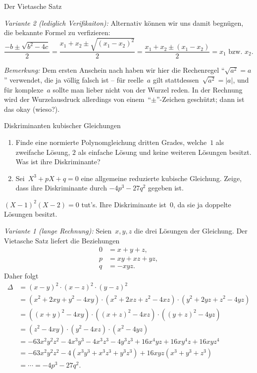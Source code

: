 \documentclass{algblatt}
\begin{document}
\begin{aufgabe}{Der Vietasche Satz}
\begin{loesungE}
\emph{Variante 2 (lediglich Verifikaiton):} Alternativ können wir uns damit
begnügen, die bekannte Formel zu verfizieren:
\[ \frac{-b \pm \sqrt{b^2 - 4c}}{2} =
  \frac{x_1 + x_2 \pm \sqrt{(x_1 - x_2)^2}}{2} =
  \frac{x_1 + x_2 \pm (x_1 - x_2)}{2} =
  \text{$x_1$ bzw. $x_2$}. \]

\emph{Bemerkung:} Dem ersten Anschein nach haben wir hier die Rechenregel
"`$\sqrt{a^2} = a$"' verwendet, die ja völlig falsch ist -- für reelle~$a$ gilt
stattdessen~$\sqrt{a^2} = |a|$, und für komplexe~$a$ sollte man lieber nicht
von der Wurzel reden. In der Rechnung wird der Wurzelausdruck allerdings von
einem~"`$\pm$"'-Zeichen geschützt; dann ist das okay (wieso?).
\end{loesungE}
\end{aufgabe}

\begin{aufgabe}{Diskriminanten kubischer Gleichungen}
\begin{enumerate}
\item Finde eine normierte Polynomgleichung dritten Grades, welche~$1$
als zweifache Lösung, $2$ als einfache Lösung und keine weiteren Lösungen
besitzt. Was ist ihre Diskriminante?
\item Sei~$X^3 + p X + q = 0$ eine allgemeine reduzierte kubische Gleichung.
Zeige, dass ihre Diskriminante durch $-4 p^3 - 27 q^2$ gegeben ist.
\end{enumerate}
\begin{loesungE}
\item $(X - 1)^2 (X - 2) = 0$ tut's. Ihre Diskriminante ist~$0$, da sie ja
doppelte Lösungen besitzt.

\item \emph{Variante 1 (lange Rechnung):} Seien~$x,y,z$ die drei Lösungen der
Gleichung. Der Vietasche Satz liefert die Beziehungen
\begin{align*}
  0 &= x+y+z, \\
  p &= xy + xz + yz, \\
  q &= -xyz.
\end{align*}
Daher folgt
\begin{align*}
  \Delta &= (x-y)^2 \cdot (x-z)^2 \cdot (y-z)^2 \\
  &= (x^2+2xy+y^2-4xy) \cdot (x^2+2xz+z^2-4xz) \cdot (y^2+2yz+z^2-4yz) \\
  &= ((x+y)^2-4xy) \cdot ((x+z)^2-4xz) \cdot ((y+z)^2-4yz) \\
  &= (z^2-4xy) \cdot (y^2-4xz) \cdot (x^2-4yz) \\
  &= -63x^2y^2z^2 -4x^3y^3 - 4x^3z^3 - 4y^3z^3 + 16x^4yz + 16xy^4z + 16xyz^4 \\
  &= -63x^2y^2z^2 - 4(x^3y^3 + x^3z^3 + y^3z^3) + 16 xyz (x^3+y^3+z^3) \\
  &= \cdots = -4p^3 - 27q^2.
\end{align*}
\end{loesungE}
\end{aufgabe}
\end{document}
